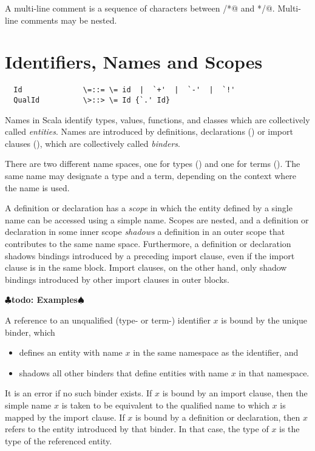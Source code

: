 \documentclass[11pt]{report}
\renewcommand{\todo}[1]{{$\clubsuit$\bf todo: #1$\spadesuit$}}
\begin{document}
A multi-line comment is a sequence of characters between \verb@/*@ and
\verb@*/@. Multi-line comments may be nested.


\chapter{\label{sec:names}Identifiers, Names and Scopes}

\syntax\begin{verbatim}
  Id              \=::= \= id  |  `+'  |  `-'  |  `!'
  QualId          \>::> \= Id {`.' Id}
\end{verbatim}

Names in Scala identify types, values, functions, and classes which
are collectively called {\em entities}.  Names are introduced by
definitions, declarations () or import clauses
(), which are collectively called {\em binders}.

There are two different name spaces, one for types ()
and one for terms ().  The same name may designate a
type and a term, depending on the context where the name is used.  

A definition or declaration has a {\em scope} in which the entity
defined by a single name can be accessed using a simple name. Scopes
are nested, and a definition or declaration in some inner scope {\em
shadows} a definition in an outer scope that contributes to the same
name space. Furthermore, a definition or declaration shadows bindings
introduced by a preceding import clause, even if the import clause is
in the same block. Import clauses, on the other hand, only shadow
bindings introduced by other import clauses in outer blocks.

\todo{Examples}

A reference to an unqualified (type- or term-) identifier $x$ is bound
by the unique binder, which
\begin{itemize}
\item defines an entity with name $x$ in the same namespace as the
identifier, and
\item shadows all other binders that define entities with name $x$ in that namespace.
\end{itemize}
It is an error if no such binder exists.  If $x$ is bound by an import
clause, then the simple name $x$ is taken to be equivalent to the
qualified name to which $x$ is mapped by the import clause. If $x$ is bound by a definition or declaration,
then $x$ refers to the entity introduced by that
binder. In that case, the type of $x$ is the type of the referenced
entity.
\end{document}
